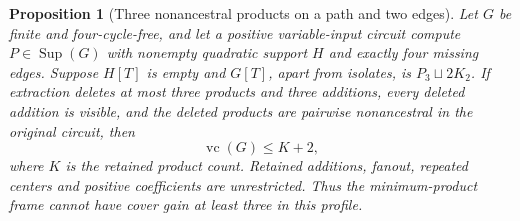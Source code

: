 \documentclass[11pt]{article}
\newcommand{\Sup}{\operatorname{Sup}}
\newcommand{\vc}{\operatorname{vc}}
\newtheorem{proposition}[theorem]{Proposition}
\theoremstyle{definition}
\theoremstyle{remark}
\begin{document}
\begin{proposition}[Three nonancestral products on a path and two edges]\label{prop:paththreevisible}
Let $G$ be finite and four-cycle-free, and let a positive variable-input circuit compute $P\in\Sup(G)$ with nonempty quadratic support $H$ and exactly four missing edges. Suppose $H[T]$ is empty and $G[T]$, apart from isolates, is $P_3\sqcup2K_2$. If extraction deletes at most three products and three additions, every deleted addition is visible, and the deleted products are pairwise nonancestral in the original circuit, then
\[
\vc(G)\le K+2,
\]
where $K$ is the retained product count. Retained additions, fanout, repeated centers and positive coefficients are unrestricted. Thus the minimum-product frame cannot have cover gain at least three in this profile.
\end{proposition}
\end{document}
